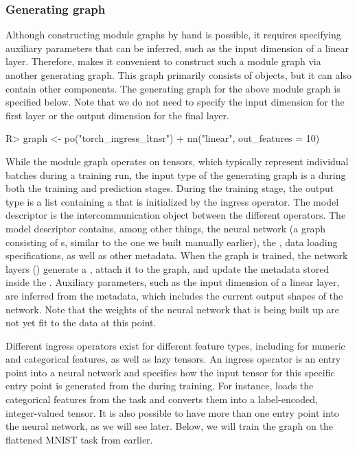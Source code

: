 \documentclass[article]{jss}
\theoremstyle{definition}
\begin{document}
\subsubsection{Generating graph}

Although constructing module graphs by hand is possible, it requires specifying auxiliary parameters that can be inferred, such as the input dimension of a linear layer.
Therefore,  makes it convenient to construct such a module graph via another generating graph.
This graph primarily consists of  objects, but it can also contain other components.
The generating graph for the above module graph is specified below.
Note that we do not need to specify the input dimension for the first layer or the output dimension for the final layer.

\begin{CodeInput}
R> graph <- po("torch_ingress_ltnsr") %
+    nn("linear", out_features = 10) %
\end{CodeInput}

While the module graph operates on tensors, which typically represent individual batches during a training run, the input type of the generating graph is a  during both the training and prediction stages.
During the training stage, the output type is a list containing a  that is initialized by the  ingress operator.
The model descriptor is the intercommunication object between the different  operators.
The model descriptor contains, among other things, the neural network (a graph consisting of s, similar to the one we built manually earlier), the , data loading specifications, as well as other metadata.
When the graph is trained, the network layers () generate a , attach it to the graph, and update the metadata stored inside the .
Auxiliary parameters, such as the input dimension of a linear layer, are inferred from the metadata, which includes the current output shapes of the network.
Note that the weights of the neural network that is being built up are not yet fit to the data at this point.

Different ingress operators exist for different feature types, including for numeric and categorical features, as well as lazy tensors.
An ingress operator is an entry point into a neural network and specifies how the input tensor for this specific entry point is generated from the  during training.
For instance,  loads the categorical features from the task and converts them into a label-encoded, integer-valued tensor.
It is also possible to have more than one entry point into the neural network, as we will see later.
Below, we will train the graph on the flattened MNIST task from earlier.
\end{document}

